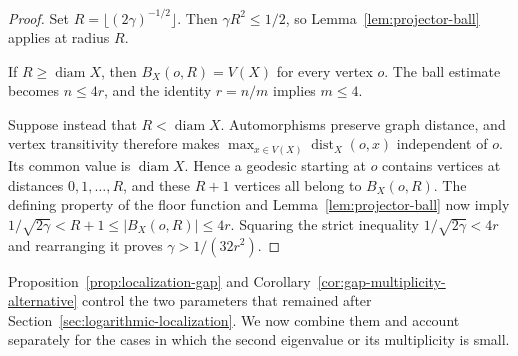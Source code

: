 \documentclass[11pt]{article}
\theoremstyle{definition}
\theoremstyle{remark}
\begin{document}
\begin{proof}
Set $R=\lfloor(2\gamma)^{-1/2}\rfloor$. Then $\gamma R^2\leq1/2$, so Lemma~\ref{lem:projector-ball} applies at radius $R$.

If $R\geq\operatorname{diam}X$, then $B_X(o,R)=V(X)$ for every vertex $o$. The ball estimate becomes $n\leq4r$, and the identity $r=n/m$ implies $m\leq4$.

Suppose instead that $R<\operatorname{diam}X$. Automorphisms preserve graph distance, and vertex transitivity therefore makes $\max_{x\in V(X)}\operatorname{dist}_X(o,x)$ independent of $o$. Its common value is $\operatorname{diam}X$. Hence a geodesic starting at $o$ contains vertices at distances $0,1,\ldots,R$, and these $R+1$ vertices all belong to $B_X(o,R)$. The defining property of the floor function and Lemma~\ref{lem:projector-ball} now imply $1/\sqrt{2\gamma}<R+1\leq|B_X(o,R)|\leq4r$. Squaring the strict inequality $1/\sqrt{2\gamma}<4r$ and rearranging it proves $\gamma>1/(32r^2)$.
\end{proof}

Proposition~\ref{prop:localization-gap} and Corollary~\ref{cor:gap-multiplicity-alternative} control the two parameters that remained after Section~\ref{sec:logarithmic-localization}. We now combine them and account separately for the cases in which the second eigenvalue or its multiplicity is small.
\end{document}
